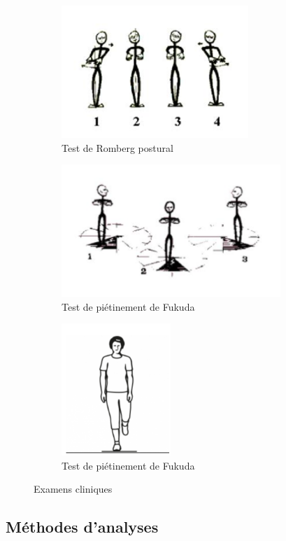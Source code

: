 \begin{figure}[ht]
    \centering
    \begin{subfigure}[b]{0.45\textwidth}
      \centering
      \includegraphics[height=5cm]{images/Exam_cli/Romberg.png}
    \caption{Test de Romberg postural}\label{fig:Romberg}
    \end{subfigure}
    \begin{subfigure}[b]{0.45\textwidth}
      \centering
      \includegraphics[height=5cm]{images/Exam_cli/pietinement.png}
      \caption{Test de piétinement de Fukuda }\label{fig:pietinement}
    \end{subfigure}
    \begin{subfigure}[b]{0.45\textwidth}
      \centering
      \includegraphics[height=5cm]{images/Exam_cli/Unipodal.png}
    \caption{Test de piétinement de Fukuda }\label{fig:unipodal}
    \end{subfigure}
    \caption{Examens cliniques}\label{fig:global}
  \end{figure}
\subsection{Méthodes d'analyses}

